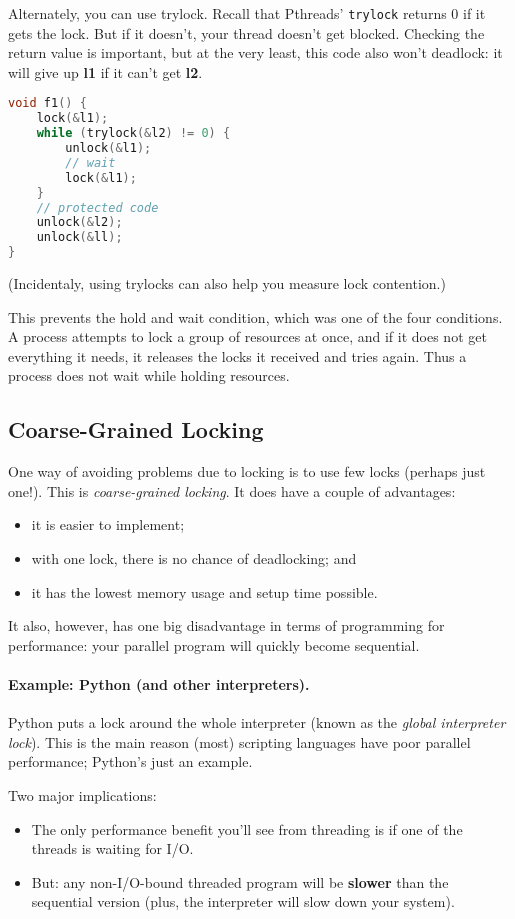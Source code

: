 Alternately, you can use trylock. Recall that Pthreads' {\tt trylock}
returns 0 if it gets the lock. But if it doesn't, your thread doesn't get blocked. Checking the return value is important, but at the very least, this code also won't deadlock: it will give up {\bf l1} if it can't get {\bf l2}.
  \begin{lstlisting}[language=C]
void f1() {
    lock(&l1);
    while (trylock(&l2) != 0) {
        unlock(&l1);
        // wait
        lock(&l1);
    }
    // protected code
    unlock(&l2);
    unlock(&ll);    
}
  \end{lstlisting}
  (Incidentaly, using trylocks can also help you measure lock contention.)
  
This prevents the hold and wait condition, which was one of the four conditions. A process attempts to lock a group of resources at once, and if it does not get everything it needs, it releases the locks it received and tries again. Thus a process does not wait while holding resources.

\subsection*{Coarse-Grained Locking}
One way of avoiding problems due to locking is to use few locks
(perhaps just one!). This is \emph{coarse-grained locking}.
It does have a couple of advantages:
  \begin{itemize}
    \item it is easier to implement;
    \item with one lock, there is no chance of deadlocking; and
    \item it has the lowest memory usage and setup time possible.
  \end{itemize}

It also, however, has one big disadvantage in terms of programming for performance: your parallel program will quickly become sequential.

\paragraph{Example: Python (and other interpreters).}
Python puts a lock around the whole interpreter (known as the
\emph{global interpreter lock}).  This is the main reason (most)
scripting languages have poor parallel performance; Python's just an
example.

Two major implications:
\begin{itemize}
\item The only performance benefit you'll see from threading is if one of the threads is
      waiting for I/O.
\item But: any non-I/O-bound threaded program will be {\bf slower} than the sequential
      version (plus, the interpreter will slow down your system).
\end{itemize}

